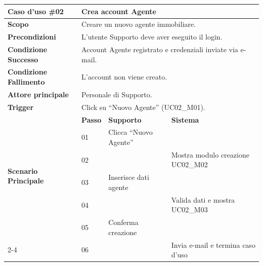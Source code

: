 \documentclass{article}
\begin{document}
\begin{table}[H]
\centering
\renewcommand{\arraystretch}{1.5}
\begin{tabular}{|p{3cm}|l|p{4.5cm}|p{4.5cm}|}
\hline
\rowcolor[HTML]{010066} 
{\color[HTML]{EFEFEF} \textbf{Caso d'uso \#02}} & \multicolumn{3}{l|}{\color[HTML]{FFFFFF} \textbf{Crea account Agente}} \\ \hline

\textbf{Scopo} & \multicolumn{3}{l|}{Creare un nuovo agente immobiliare.} \\ \hline

\textbf{Precondizioni} & \multicolumn{3}{l|}{L'utente Supporto deve aver eseguito il login.} \\ \hline

\textbf{Condizione Successo} & \multicolumn{3}{l|}{Account Agente registrato e credenziali inviate via e-mail.} \\ \hline

\textbf{Condizione Fallimento} & \multicolumn{3}{l|}{L'account non viene creato.} \\ \hline

\textbf{Attore principale} & \multicolumn{3}{l|}{Personale di Supporto.} \\ \hline

\textbf{Trigger} & \multicolumn{3}{l|}{Click su ``Nuovo Agente'' (UC02\_M01).} \\ \hline

\hline
\multirow{6}{3cm}{\textbf{Scenario Principale}} 
   & \textbf{Passo} & \textbf{Supporto} & \textbf{Sistema} \\ \cline{2-4}
   & 01 & Clicca ``Nuovo Agente'' & \\ \cline{2-4}
   & 02 & & Mostra modulo creazione UC02\_M02 \\ \cline{2-4}
   & 03 & Inserisce dati agente & \\ \cline{2-4}
   & 04 & & Valida dati e mostra UC02\_M03 \\ \cline{2-4}
   & 05 & Conferma creazione & \\ \cline{2-4}
   & 06 & & Invia e-mail e termina caso d'uso \\ \hline


\end{tabular}
\end{table}
\end{document}
